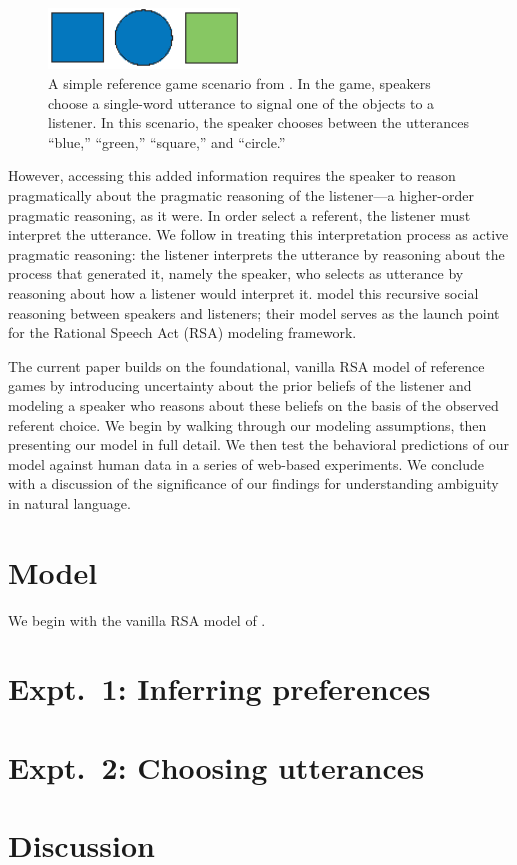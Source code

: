 \documentclass[10pt,a4paper]{article}
\begin{document}
\begin{figure}
	\centering
	\includegraphics[width=2in]{images/rsa_scene.eps}
	\caption{A simple reference game scenario from . In the game, speakers choose a single-word utterance to signal one of the objects to a listener. In this scenario, the speaker chooses between the utterances ``blue,'' ``green,'' ``square,'' and ``circle.''}\label{FG-ref-game}
\end{figure}

However, accessing this added information requires the speaker to reason pragmatically about the pragmatic reasoning of the listener---a higher-order pragmatic reasoning, as it were. In order select a referent, the listener must interpret the utterance. We follow  in treating this interpretation process as active pragmatic reasoning: the listener interprets the utterance by reasoning about the process that generated it, namely the speaker, who selects as utterance by reasoning about how a listener would interpret it. \citeauthor{frankgoodman2012} model this recursive social reasoning between speakers and listeners; their model serves as the launch point for the Rational Speech Act (RSA) modeling framework.

The current paper builds on the foundational, vanilla RSA model of reference games by introducing uncertainty about the prior beliefs of the listener and modeling a speaker who reasons about these beliefs on the basis of the observed referent choice. We begin by walking through our modeling assumptions, then presenting our model in full detail. We then test the behavioral predictions of our model against human data in a series of web-based experiments. We conclude with a discussion of the significance of our findings for understanding ambiguity in natural language.


\section{Model}

We begin with the vanilla RSA model of .


\section{Expt.~1: Inferring preferences}


\section{Expt.~2: Choosing utterances}


\section{Discussion}




\setlength{\bibleftmargin}{.125in}
\setlength{\bibindent}{-\bibleftmargin}


\end{document}
